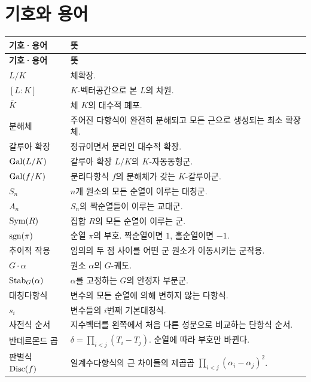 \chapter*{기호와 용어}

\renewcommand{\arraystretch}{1.2}
\begin{longtable}{>{\raggedright\arraybackslash}p{}>{\raggedright\arraybackslash}p{}}
\toprule
\textbf{기호·용어} & \textbf{뜻} \\
\midrule
\endfirsthead
\toprule
\textbf{기호·용어} & \textbf{뜻} \\
\midrule
\endhead
\bottomrule
\endfoot

$L/K$ & 체확장. \\
$[L:K]$ & $K$-벡터공간으로 본 $L$의 차원. \\
$\overline K$ & 체 $K$의 대수적 폐포. \\
분해체 & 주어진 다항식이 완전히 분해되고 모든 근으로 생성되는 최소 확장체. \\
갈루아 확장 & 정규이면서 분리인 대수적 확장. \\
$\operatorname{Gal}(L/K)$ & 갈루아 확장 $L/K$의 $K$-자동동형군. \\
$\operatorname{Gal}(f/K)$ & 분리다항식 $f$의 분해체가 갖는 $K$-갈루아군. \\
$S_n$ & $n$개 원소의 모든 순열이 이루는 대칭군. \\
$A_n$ & $S_n$의 짝순열들이 이루는 교대군. \\
$\operatorname{Sym}(R)$ & 집합 $R$의 모든 순열이 이루는 군. \\
$\operatorname{sgn}(\pi)$ & 순열 $\pi$의 부호. 짝순열이면 $1$, 홀순열이면 $-1$. \\
추이적 작용 & 임의의 두 점 사이를 어떤 군 원소가 이동시키는 군작용. \\
$G\cdot\alpha$ & 원소 $\alpha$의 $G$-궤도. \\
$\operatorname{Stab}_G(\alpha)$ & $\alpha$를 고정하는 $G$의 안정자 부분군. \\
대칭다항식 & 변수의 모든 순열에 의해 변하지 않는 다항식. \\
$s_i$ & 변수들의 $i$번째 기본대칭식. \\
사전식 순서 & 지수벡터를 왼쪽에서 처음 다른 성분으로 비교하는 단항식 순서. \\
반데르몬드 곱 & $\delta=\prod_{i<j}(T_i-T_j)$. 순열에 따라 부호만 바뀐다. \\
판별식 $\operatorname{Disc}(f)$ & 일계수다항식의 근 차이들의 제곱곱 $\prod_{i<j}(\alpha_i-\alpha_j)^2$. \\

\end{longtable}
